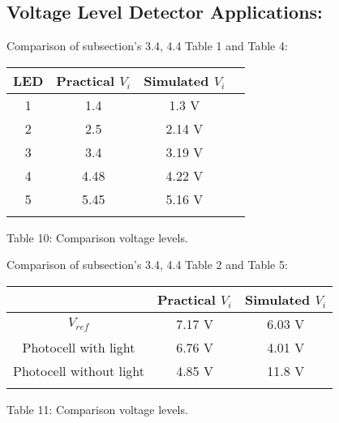 \subsection{Voltage Level Detector Applications:}

Comparison of subsection's 3.4, 4.4 Table 1 and Table 4: \hfill \break

\begin{center}
\begin{tabular}[.5cm]{c c c c}
\toprule
\toprule
\hspace{50pt} LED \hspace{50pt} & \hspace{45pt} Practical $V_{i}$ \hspace{45pt}  & \hspace{40pt} Simulated $V_{i}$ \hspace{40pt}  \\
\midrule
\midrule
1 & 1.4 & 1.3 V \\
\cmidrule{1-3}
2 & 2.5 & 2.14 V \\
\cmidrule{1-3}
3 & 3.4 & 3.19 V \\
\cmidrule{1-3}
4 & 4.48 & 4.22 V \\
\cmidrule{1-3}
5 & 5.45 & 5.16 V \\
\bottomrule
\linebreak
\end{tabular}
\linebreak Table 10: Comparison voltage levels.
\end{center} \hfill

Comparison of subsection's 3.4, 4.4 Table 2 and Table 5: \hfill \break

\begin{center}
\begin{tabular}[.5cm]{c c c}
\toprule
\toprule
\hspace{10pt} & \hspace{50pt} Practical $V_{i}$ \hspace{50pt} & \hspace{50pt} Simulated $V_{i}$ \hspace{50pt}  \\
\midrule
\midrule
$V_{ref}$ & 7.17 V & 6.03 V \\
\cmidrule{1-3}
Photocell with light & 6.76 V & 4.01 V \\
\cmidrule{1-3}
Photocell without light & 4.85 V & 11.8 V \\
\bottomrule
\linebreak
\end{tabular}
\linebreak Table 11: Comparison voltage levels.
\end{center} \hfill

{\bfseries\itshape\color{carmine}{Observation:}} {\itshape\color{carmine}{I imagine that the measured levels and simulated ones variate because of the resistance in the preset, in the simulation it's ideal i.e 10K$\Omega$, and in the practice we variate this value constantly.}}
